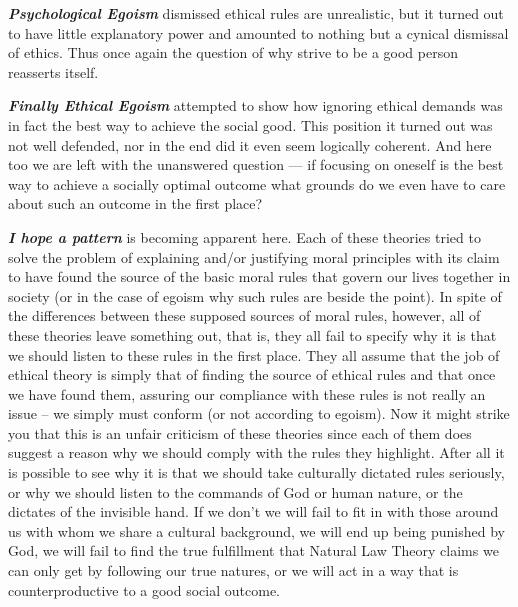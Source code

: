 \documentclass[12pt, openany]{book}
\begin{document}
\textbf{\emph{Psychological Egoism}} dismissed ethical rules are unrealistic, but it turned out to have little explanatory power and amounted to nothing but a cynical dismissal of ethics. Thus once again the question of why strive to be a good person reasserts itself.

\textbf{\emph{Finally Ethical Egoism}} attempted to show how ignoring ethical demands was in fact the best way to achieve the social good. This position it turned out was not well defended, nor in the end did it even seem logically coherent. And here too we are left with the unanswered question --- if focusing on oneself is the best way to achieve a socially optimal outcome what grounds do we even have to care about such an outcome in the first place?

\textbf{\emph{I hope a pattern}} is becoming apparent here. Each of these theories tried to solve the problem of explaining and/or justifying moral principles with its claim to have found the source of the basic moral rules that govern our lives together in society (or in the case of egoism why such rules are beside the point). In spite of the differences between these supposed sources of moral rules, however, all of these theories leave something out, that is, they all fail to specify why it is that we should listen to these rules in the first place. They all assume that the job of ethical theory is simply that of finding the source of ethical rules and that once we have found them, assuring our compliance with these rules is not really an issue -- we simply must conform (or not according to egoism). Now it might strike you that this is an unfair criticism of these theories since each of them does suggest a reason why we should comply with the rules they highlight. After all it is possible to see why it is that we should take culturally dictated rules seriously, or why we should listen to the commands of God or human nature, or the dictates of the invisible hand. If we don't we will fail to fit in with those around us with whom we share a cultural background, we will end up being punished by God, we will fail to find the true fulfillment that Natural Law Theory claims we can only get by following our true natures, or we will act in a way that is counterproductive to a good social outcome.
\end{document}
